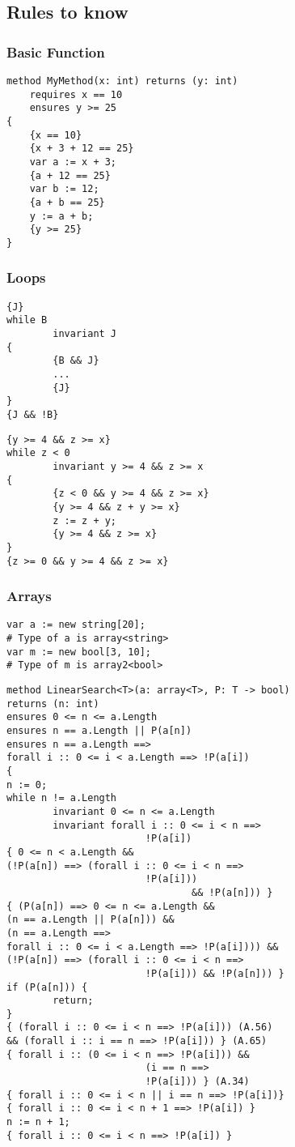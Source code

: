 \subsection{Rules to know}

\subsubsection{Basic Function} 
\begin{verbatim}
method MyMethod(x: int) returns (y: int)
    requires x == 10
    ensures y >= 25
{
    {x == 10}
    {x + 3 + 12 == 25}
    var a := x + 3;
    {a + 12 == 25}
    var b := 12;
    {a + b == 25}
    y := a + b;
    {y >= 25}
}

\end{verbatim}


\subsubsection{Loops} 
\begin{verbatim}
{J}
while B
        invariant J
{
        {B && J}
        ... 
        {J}
}
{J && !B}
\end{verbatim}

\begin{verbatim}
{y >= 4 && z >= x}
while z < 0
        invariant y >= 4 && z >= x
{
        {z < 0 && y >= 4 && z >= x}
        {y >= 4 && z + y >= x}
        z := z + y;
        {y >= 4 && z >= x}
}
{z >= 0 && y >= 4 && z >= x}
\end{verbatim}

\subsubsection{Arrays} 
\begin{verbatim}
var a := new string[20];
# Type of a is array<string>
var m := new bool[3, 10];
# Type of m is array2<bool>

\end{verbatim}
\begin{verbatim}
method LinearSearch<T>(a: array<T>, P: T -> bool)
returns (n: int)
ensures 0 <= n <= a.Length
ensures n == a.Length || P(a[n])
ensures n == a.Length ==>
forall i :: 0 <= i < a.Length ==> !P(a[i])
{
n := 0;
while n != a.Length
        invariant 0 <= n <= a.Length
        invariant forall i :: 0 <= i < n ==>
                        !P(a[i])
{ 0 <= n < a.Length &&
(!P(a[n]) ==> (forall i :: 0 <= i < n ==>
                        !P(a[i])) 
                                && !P(a[n])) }
{ (P(a[n]) ==> 0 <= n <= a.Length &&
(n == a.Length || P(a[n])) &&
(n == a.Length ==>
forall i :: 0 <= i < a.Length ==> !P(a[i]))) &&
(!P(a[n]) ==> (forall i :: 0 <= i < n ==> 
                        !P(a[i])) && !P(a[n])) }
if (P(a[n])) {
        return;
}
{ (forall i :: 0 <= i < n ==> !P(a[i])) (A.56)
&& (forall i :: i == n ==> !P(a[i])) } (A.65)
{ forall i :: (0 <= i < n ==> !P(a[i])) &&
                        (i == n ==>
                        !P(a[i])) } (A.34)
{ forall i :: 0 <= i < n || i == n ==> !P(a[i])}
{ forall i :: 0 <= i < n + 1 ==> !P(a[i]) }
n := n + 1;
{ forall i :: 0 <= i < n ==> !P(a[i]) }
\end{verbatim}

